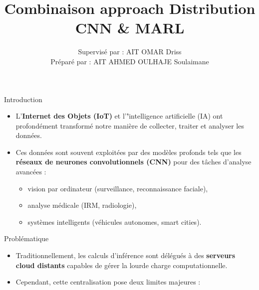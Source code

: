 \documentclass{beamer}
\title{Combinaison approach Distribution CNN \& MARL }
\author{Supervisé par : AIT OMAR Driss\\
            Préparé par : AIT AHMED OULHAJE Soulaimane}
\institute{Master AIDC — FST Béni Mellal}
\begin{document}
\begin{frame}
  \titlepage
\end{frame}
\begin{frame}{Introduction}
\begin{itemize}
    \item L’\textbf{Internet des Objets (IoT)} et l’\textbf’intelligence artificielle (IA) ont profondément transformé notre manière de collecter, traiter et analyser les données.
    \item Ces données sont souvent exploitées par des modèles profonds tels que les \textbf{réseaux de neurones convolutionnels (CNN)} pour des tâches d’analyse avancées :
    \begin{itemize}
        \item vision par ordinateur (surveillance, reconnaissance faciale),
        \item analyse médicale (IRM, radiologie),
        \item systèmes intelligents (véhicules autonomes, smart cities).
    \end{itemize}
\end{itemize}
\end{frame}

\begin{frame}{Problématique}
\begin{itemize}
    \item Traditionnellement, les calculs d’inférence sont délégués à des \textbf{serveurs cloud distants} capables de gérer la lourde charge computationnelle.
    \item Cependant, cette centralisation pose deux limites majeures :
\end{itemize}

\end{frame}
\end{document}
